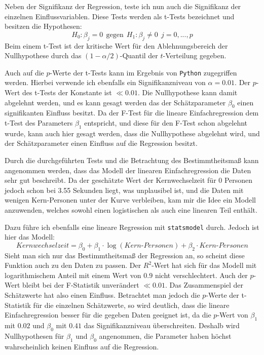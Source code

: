 Neben der Signifikanz der Regression, teste ich nun auch die Signifikanz der einzelnen Einflussvariablen. Diese Tests werden als t-Tests bezeichnet und besitzen die Hypothesen:
$$ H_0:\beta_j = 0 \ \ \text{gegen} \ \ H_1: \beta_j \neq 0 \ \ j = 0, ..., p$$
Beim einem t-Test ist der kritische Wert für den Ablehnungsbereich der Nullhypothese durch das $(1-\alpha/2)$-Quantil der $t$-Verteilung gegeben.

Auch auf die $p$-Werte der t-Tests kann im Ergebnis von \texttt{Python} zugegriffen werden. Hierbei verwende ich ebenfalls ein Signifikanzniveau von $\alpha = 0.01$. Der $p$-Wert des t-Tests der Konstante ist $\ll 0.01$. Die Nullhypothese kann damit abgelehnt werden, und es kann gesagt werden das der Schätzparameter $\beta_0$ einen signifikanten Einfluss besitzt. Da der F-Test für die lineare Einfachregression dem t-Test des Parameters $\beta_1$ entspricht, und diese für den F-Test schon abgelehnt wurde, kann auch hier gesagt werden, dass die Nullhypothese abgelehnt wird, und der Schätzparameter einen Einfluss auf die Regression besitzt.

Durch die durchgeführten Tests und die Betrachtung des Bestimmtheitsmaß kann angenommen werden, dass das Modell der linearen Einfachregression die Daten sehr gut beschreibt. Da der geschätzte Wert der Kernwechselzeit für 0 Personen jedoch schon bei 3.55 Sekunden liegt, was unplausibel ist, und die Daten mit wenigen Kern-Personen unter der Kurve verbleiben, kam mir die Idee ein Modell anzuwenden, welches sowohl einen logistischen als auch eine linearen Teil enthält.

Dazu führe ich ebenfalls eine lineare Regression mit \texttt{statsmodel} durch. Jedoch ist hier das Modell:
\begin{equation}
Kernwechselzeit = \beta_0 + \beta_1 \cdot \log(Kern\text{-}Personen) + \beta_2 \cdot Kern\text{-}Personen
\end{equation}
Sieht man sich nur das Bestimmtheitsmaß der Regression an, so scheint diese Funktion auch zu den Daten zu passen. Der $R^2$-Wert hat sich für das Modell mit logarithmischem Anteil mit einem Wert von $0.9$ nicht verschlechtert. Auch der $p$-Wert bleibt bei der F-Statistik unverändert $\ll 0.01$. Das Zusammenspiel der Schätzwerte hat also einen Einfluss. Betrachtet man jedoch die $p$-Werte der t-Statistik für die einzelnen Schätzwerte, so wird deutlich, dass die lineare Einfachregression besser für die gegeben Daten geeignet ist, da die $p$-Wert von $\beta_1$ mit $0.02$ und $\beta_0$ mit $0.41$ das Signifikanzniveau überschreiten. Deshalb wird Nullhypothesen für $\beta_1$ und $\beta_0$ angenommen, die Parameter haben höchst wahrscheinlich keinen Einfluss auf die Regression.

